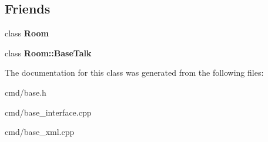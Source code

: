 \subsection*{Friends}
\begin{DoxyCompactItemize}
\item 
class {\bfseries Room}\hypertarget{classBaseInterface_ad579dfb5bd3be0d05d8775896307d9b3}{}\label{classBaseInterface_ad579dfb5bd3be0d05d8775896307d9b3}

\item 
class {\bfseries Room\+::\+Base\+Talk}\hypertarget{classBaseInterface_a1a3ddb07dae2662cb2eca8ea742168cd}{}\label{classBaseInterface_a1a3ddb07dae2662cb2eca8ea742168cd}

\end{DoxyCompactItemize}


The documentation for this class was generated from the following files\+:\begin{DoxyCompactItemize}
\item 
cmd/base.\+h\item 
cmd/base\+\_\+interface.\+cpp\item 
cmd/base\+\_\+xml.\+cpp\end{DoxyCompactItemize}
